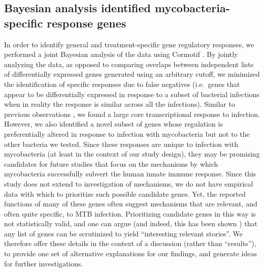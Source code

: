\subsection{Bayesian analysis identified mycobacteria-specific
response
genes}\label{bayesian-analysis-identified-mycobacteria-specific-response-genes}

In order to identify general and treatment-specific gene regulatory
responses, we performed a joint Bayesian analysis of the data using
Cormotif \citep{Wei2015}. By jointly analyzing the data, as opposed to
comparing overlaps between independent lists of differentially expressed
genes generated using an arbitrary cutoff, we minimized the
identification of specific responses due to false negatives (i.e.~genes
that appear to be differentially expressed in response to a subset of
bacterial infections when in reality the response is similar across all
the infections). Similar to previous observations \citep{Huang2001,
Boldrick2002}, we found a large core transcriptional response to
infection. However, we also identified a novel subset of genes whose
regulation is preferentially altered in response to infection with
mycobacteria but not to the other bacteria we tested. Since these
responses are unique to infection with mycobacteria (at least in the
context of our study design), they may be promising candidates for
future studies that focus on the mechanisms by which mycobacteria
successfully subvert the human innate immune response. Since this study
does not extend to investigation of mechanisms, we do not have empirical
data with which to prioritize such possible candidate genes. Yet, the
reported functions of many of these genes often suggest mechanisms that
are relevant, and often quite specific, to MTB infection. Prioritizing
candidate genes in this way is not statistically valid, and one can
argue (and indeed, this has been shown \citep{Pavlidis2012}) that any
list of genes can be scrutinized to yield ``interesting relevant
stories''. We therefore offer these details in the context of a
discussion (rather than ``results''), to provide one set of alternative
explanations for our findings, and generate ideas for further
investigations.

